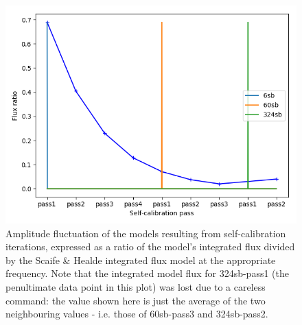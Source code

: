 \begin{figure}[h!]
\includegraphics[width=0.8\linewidth]{images/AmpFluct.png}
\caption{\label{fig.SC.ampfluct} Amplitude fluctuation of the models resulting from self-calibration iterations, expressed as a ratio of the model's integrated flux divided by the Scaife \& Healde integrated flux model at the appropriate frequency. Note that the integrated model flux for 324sb-pass1 (the penultimate data point in this plot) was lost due to a careless command: the value shown here is just the average of the two neighbouring values - i.e. those of 60sb-pass3 and 324sb-pass2.}
\end{figure}

